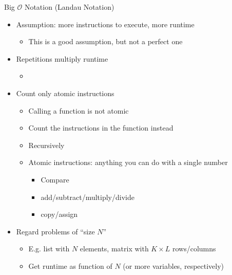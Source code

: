 
\begin{frame}[fragile]{Big $\mathcal{O}$ Notation (Landau Notation)}
%
\begin{itemize}
\item Assumption: more instructions to execute, more runtime
	\begin{itemize}
	\item This is a good assumption, but not a perfect one
	\end{itemize}
\item Repetitions multiply runtime
	\begin{itemize}
	\item {}
	\end{itemize}
\item Count only atomic instructions
	\begin{itemize}
	\item Calling a function is not atomic
	\item Count the instructions in the function instead
	\item Recursively
	\item Atomic instructions: anything you can do with a single number
		\begin{itemize}
		\item Compare
		\item add/subtract/multiply/divide
		\item copy/assign
		\end{itemize}
	\end{itemize}
\item Regard problems of \enquote{size $N$}
	\begin{itemize}
	\item E.\;g. list with $N$ elements, matrix with $K \times L$ rows/columns
	\item Get runtime as function of $N$ (or more variables, respectively)
	\end{itemize}
\end{itemize}
%
\end{frame}


